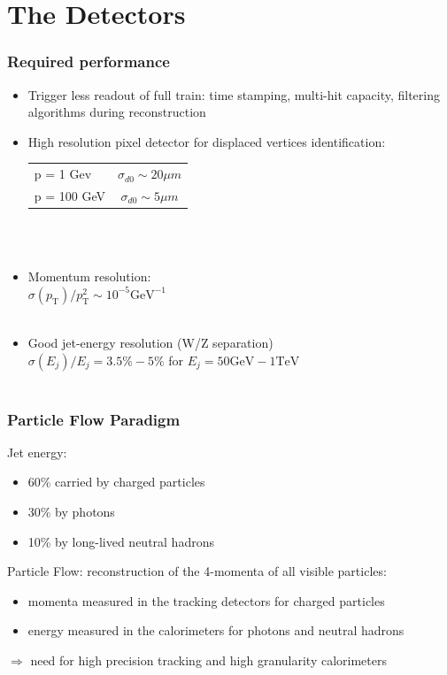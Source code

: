 \documentclass{beamer}
\begin{document}
\section[Detectors]{The Detectors}
\begin{frame}
\frametitle{Required performance}
\begin{itemize}
  \item Trigger less readout of full train: time stamping, multi-hit capacity,
  filtering algorithms during reconstruction
  \item High resolution pixel detector for displaced vertices identification:\\
  {\scriptsize
  \begin{tabular}{lc}
  p = 1 Gev & $\sigma_{d0}\sim20\mu m$\\
  p = 100 GeV & $\sigma_{d0}\sim5\mu m$
  \end{tabular}
  }~\\ ~\\
  \item Momentum resolution:\\
  {\scriptsize 
  $\sigma(p_{\textrm{T}})/p_{\textrm{T}}^2\sim 10^{-5}\textrm{GeV}^{-1}$
   }~\\ ~\\
  \item Good jet-energy resolution (W/Z separation)\\
  {\scriptsize 
$\sigma(E_j)/E_j = 3.5\%-5\%$ for $E_j = 50\textrm{GeV}-1\textrm{TeV}$
  }~\\ ~\\
\end{itemize}
\end{frame}
\begin{frame}
\frametitle{Particle Flow Paradigm}
Jet energy:
\begin{itemize}
  \item 60\% carried by charged particles
  \item 30\% by photons
  \item 10\% by long-lived neutral hadrons
\end{itemize}
Particle Flow: reconstruction of the \alert{4-momenta of all visible
particles}:
\begin{itemize}
  \item momenta measured in the tracking detectors for charged particles
  \item energy measured in the calorimeters for photons and neutral hadrons
\end{itemize}
$\Rightarrow$ need for \alert{high precision tracking and high granularity
calorimeters}
\end{frame}
\end{document}
